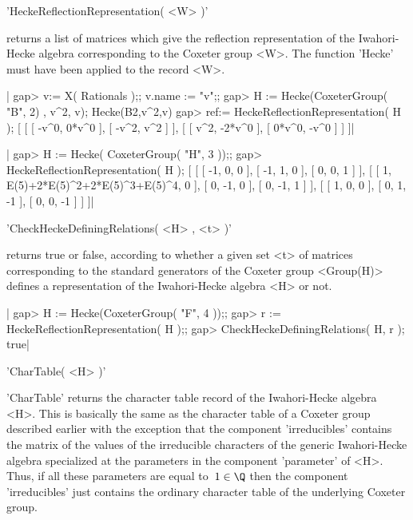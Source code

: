 
'HeckeReflectionRepresentation( <W> )'

returns a list  of matrices which give  the reflection  representation of
the Iwahori-Hecke algebra  corresponding to the  Coxeter group <W>.   The
function 'Hecke' must have been applied to the record <W>.

|    gap> v:= X( Rationals );;  v.name := "v";;
    gap> H := Hecke(CoxeterGroup( "B", 2) , v^2, v);
    Hecke(B2,v^2,v)
    gap> ref:= HeckeReflectionRepresentation( H );
    [ [ [ -v^0, 0*v^0 ], [ -v^2, v^2 ] ],
      [ [ v^2, -2*v^0 ], [ 0*v^0, -v^0 ] ] ]|

|    gap> H := Hecke( CoxeterGroup( "H", 3 ));;
    gap> HeckeReflectionRepresentation( H );
    [ [ [ -1, 0, 0 ], [ -1, 1, 0 ], [ 0, 0, 1 ] ],
      [ [ 1, E(5)+2*E(5)^2+2*E(5)^3+E(5)^4, 0 ], [ 0, -1, 0 ],
          [ 0, -1, 1 ] ], [ [ 1, 0, 0 ], [ 0, 1, -1 ], [ 0, 0, -1 ] ] ]|


'CheckHeckeDefiningRelations( <H> , <t> )'

returns true or false, according  to whether a  given set <t> of matrices
corresponding to the standard generators  of the Coxeter group <Group(H)>
defines a representation of the Iwahori-Hecke algebra <H> or not.

|    gap> H := Hecke(CoxeterGroup( "F", 4 ));;
    gap> r := HeckeReflectionRepresentation( H );;
    gap> CheckHeckeDefiningRelations( H, r );
    true|

'CharTable( <H> )'

'CharTable'  returns the  character  table record  of the  Iwahori-Hecke
algebra <H>.  This is  basically the  same as the  character table  of a
Coxeter group  described earlier with  the exception that  the component
'irreducibles'  contains the  matrix of  the values  of the  irreducible
characters  of  the generic  Iwahori-Hecke  algebra  specialized at  the
parameters  in the  component 'parameter'  of  <H>. Thus,  if all  these
parameters are  equal to~$1  \in \Q$  then the  component 'irreducibles'
just contains  the ordinary  character table  of the  underlying Coxeter
group.

